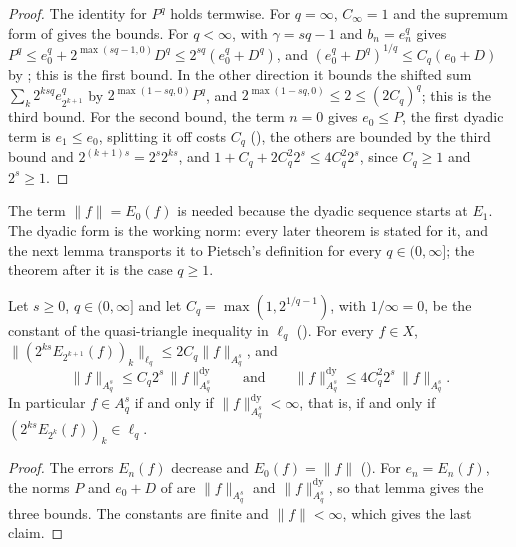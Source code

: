 \begin{proof}
\leanok
{}
The identity for $P^q$ holds termwise. For $q = \infty$, $C_\infty = 1$ and the supremum form
of  gives the bounds. For $q < \infty$,  with
$\gamma = sq - 1$ and $b_n = e_n^q$ gives
$P^q \leq e_0^q + 2^{\max(sq - 1, 0)} D^q \leq 2^{sq} (e_0^q + D^q)$, and
$(e_0^q + D^q)^{1/q} \leq C_q (e_0 + D)$ by ; this is the first
bound. In the other direction it bounds the shifted sum $\sum_k 2^{ksq} e_{2^{k+1}}^q$ by
$2^{\max(1 - sq, 0)} P^q$, and $2^{\max(1 - sq, 0)} \leq 2 \leq (2 C_q)^q$; this is the third
bound. For the second bound, the term $n = 0$ gives $e_0 \leq P$, the first dyadic term is
$e_1 \leq e_0$, splitting it off costs $C_q$ (), the others are
bounded by the third bound and $2^{(k+1)s} = 2^s 2^{ks}$, and
$1 + C_q + 2 C_q^2 2^s \leq 4 C_q^2 2^s$, since $C_q \geq 1$ and $2^s \geq 1$.
\end{proof}

The term $\|f\| = E_0(f)$ is needed because the dyadic sequence starts at $E_1$. The dyadic
form is the working norm: every later theorem is stated for it, and the next lemma transports
it to Pietsch's definition for every $q \in (0, \infty]$; the theorem after it is the case
$q \geq 1$.

\begin{lemma}
\label{lem:dyadic-norm-below-one}
\leanok
{}
Let $s \geq 0$, $q \in (0, \infty]$ and let $C_q = \max(1, 2^{1/q - 1})$, with $1/\infty = 0$, be
the constant of the quasi-triangle inequality in $\ell_q$ (). For
every $f \in X$,
$\|(2^{ks} E_{2^{k+1}}(f))_k\|_{\ell_q} \leq 2 C_q \|f\|_{A^s_q}$, and
\[
  \|f\|_{A^s_q} \leq C_q 2^s \, \|f\|^{\mathrm{dy}}_{A^s_q}
  \qquad \text{and} \qquad
  \|f\|^{\mathrm{dy}}_{A^s_q} \leq 4 C_q^2 2^s \, \|f\|_{A^s_q} .
\]
In particular $f \in A^s_q$ if and only if $\|f\|^{\mathrm{dy}}_{A^s_q} < \infty$, that is, if and
only if $(2^{ks} E_{2^k}(f))_k \in \ell_q$.
\end{lemma}

\begin{proof}
\leanok
{}
The errors $E_n(f)$ decrease and $E_0(f) = \|f\|$ (). For $e_n = E_n(f)$,
the norms $P$ and $e_0 + D$ of  are $\|f\|_{A^s_q}$ and
$\|f\|^{\mathrm{dy}}_{A^s_q}$, so that lemma gives the three bounds. The constants are finite and
$\|f\| < \infty$, which gives the last claim.
\end{proof}


